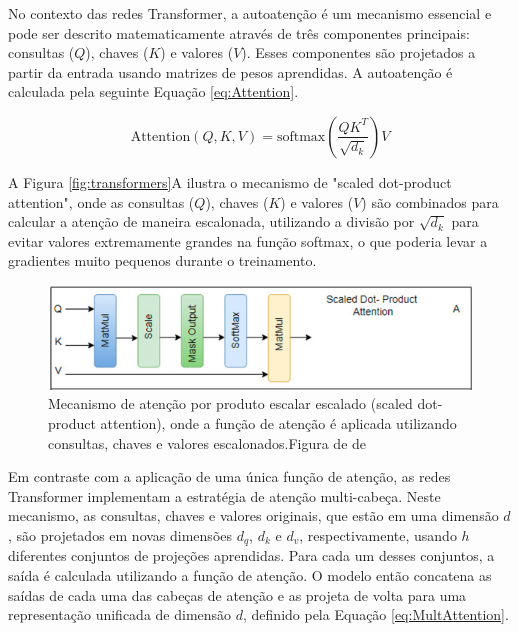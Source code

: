 No contexto das redes Transformer, a autoatenção é um mecanismo essencial e pode ser descrito matematicamente através de três componentes principais: consultas (\(Q\)), chaves (\(K\)) e valores (\(V\)). Esses componentes são projetados a partir da entrada usando matrizes de pesos aprendidas. A autoatenção é calculada pela seguinte Equação \ref{eq:Attention}.

\begin{equation}
\text{Attention}(Q, K, V) = \text{softmax}\left(\frac{QK^T}{\sqrt{d_k}}\right)V
\label{eq:Attention}
\end{equation}

A Figura \ref{fig:transformers}A ilustra o mecanismo de "scaled dot-product attention", onde as consultas (\(Q\)), chaves (\(K\)) e valores (\(V\)) são combinados para calcular a atenção de maneira escalonada, utilizando a divisão por \(\sqrt{d_k}\) para evitar valores extremamente grandes na função softmax, o que poderia levar a gradientes muito pequenos durante o treinamento.

\begin{figure}
    \centering
    \includegraphics[width=1.0\linewidth]{capitulos//figuras/scalled.png}
    \caption{Mecanismo de atenção por produto escalar escalado (scaled dot-product attention), onde a função de atenção é aplicada utilizando consultas, chaves e valores escalonados.Figura de de \textcite{THIRUNAVUKARASU2024100648}}
    \label{fig:enter-label}
\end{figure}

Em contraste com a aplicação de uma única função de atenção, as redes Transformer implementam a estratégia de atenção multi-cabeça. Neste mecanismo, as consultas, chaves e valores originais, que estão em uma dimensão \(d\), são projetados em novas dimensões \(d_q\), \(d_k\) e \(d_v\), respectivamente, usando \(h\) diferentes conjuntos de projeções aprendidas. Para cada um desses conjuntos, a saída é calculada utilizando a função de atenção. O modelo então concatena as saídas de cada uma das cabeças de atenção e as projeta de volta para uma representação unificada de dimensão \(d\), definido pela Equação \ref{eq:MultAttention}.

